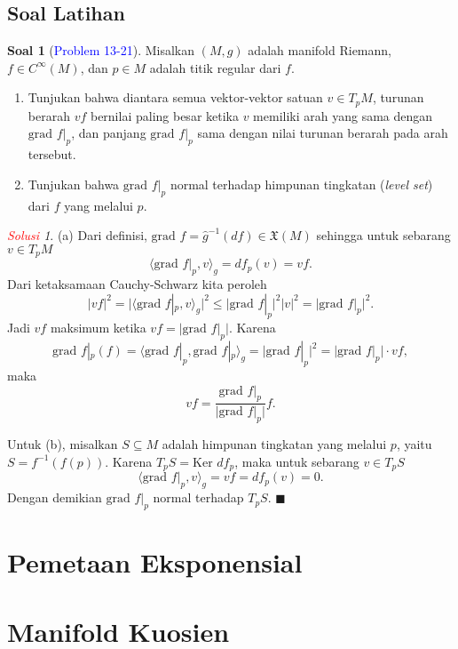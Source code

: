 \documentclass[11pt]{article}
\theoremstyle{definition}
\newtheorem*{problem}{Soal}
\theoremstyle{remark}
\newtheorem*{solution}{\textcolor{red}{Solusi}}
\newcommand{\kernel}{\text{Ker }}           %
\newcommand{\CinfM}{C^{\infty}(M)}          %
\newcommand{\grad}{\text{grad }}
\newcommand{\vectfield}{\mathfrak{X}}       %
\begin{document}
\subsection{Soal Latihan}
\begin{problem}[\textcolor{blue}{Problem 13-21}]
Misalkan $(M,g)$ adalah manifold Riemann, $f \in \CinfM$, dan $p\in M$ adalah titik regular dari $f$.
\begin{enumerate}[nolistsep]
\item[(a)] Tunjukan bahwa diantara semua vektor-vektor satuan $v \in T_pM$, turunan berarah $vf$ bernilai paling besar ketika $v$ memiliki arah yang sama dengan $\grad f|_p$, dan panjang $\grad f|_p$ sama dengan nilai turunan berarah pada arah tersebut.
\item[(b)] Tunjukan bahwa $\grad f|_p$ normal terhadap himpunan tingkatan (\textit{level set}) dari $f$ yang melalui $p$. 
\end{enumerate}
\end{problem}
\begin{solution}
(a) Dari definisi, $\grad f = \widehat{g}^{-1} (df) \in \vectfield(M)$ sehingga untuk sebarang $v \in T_pM$
$$
\langle \grad f|_p, v\rangle_g = df_p(v) = vf.
$$
Dari ketaksamaan Cauchy-Schwarz kita peroleh
$$
 |vf|^2 = \big|\langle\text{grad }f|_p, v\rangle_g\big|^2 \leq \big|\text{grad }f|_p\big|^2 \big|v\big|^2 = \big|\text{grad }f|_p\big|^2.
$$
Jadi $vf$ maksimum ketika $vf = \big|\text{grad }f|_p\big|$. Karena
$$
\grad f|_p (f) = \langle \grad f|_p,\grad f|_p \rangle_g = \big|\grad f|_p\big|^2 = \big|\grad f|_p\big| \cdot vf, 
$$
maka 
$$
vf = \frac{\grad f|_p}{\big|\grad f|_p\big|} f.
$$ 

Untuk (b), misalkan $S\subseteq M$ adalah himpunan tingkatan yang melalui $p$, yaitu $S = f^{-1}(f(p))$. Karena $T_pS = \kernel df_p$, maka untuk sebarang $v \in T_pS$
$$
 \langle \grad f|_p,v \rangle_g = vf = df_p(v) = 0.
$$
Dengan demikian $ \grad f|_p$ normal terhadap $T_pS$.  $\blacksquare$
\end{solution}




\section{Pemetaan Eksponensial}

\section{Manifold Kuosien}
\end{document}
